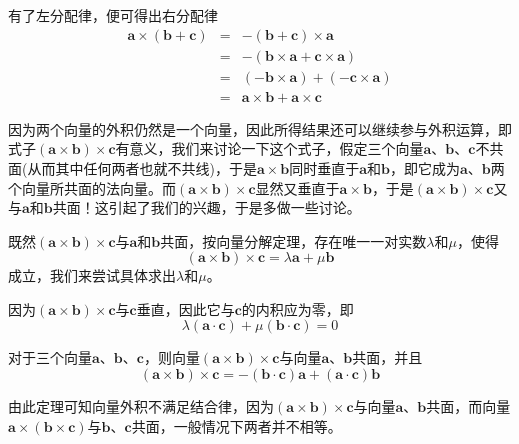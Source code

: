 有了左分配律，便可得出右分配律
\begin{eqnarray*}
  \bm{a} \times (\bm{b} + \bm{c}) & = & - (\bm{b} + \bm{c}) \times \bm{a} \\
                                  & = & - (\bm{b} \times \bm{a} + \bm{c} \times \bm{a}) \\
                                  & = & (-\bm{b}\times\bm{a}) + (-\bm{c}\times\bm{a}) \\
  & = & \bm{a}\times\bm{b} + \bm{a}\times\bm{c}
\end{eqnarray*}

因为两个向量的外积仍然是一个向量，因此所得结果还可以继续参与外积运算，即式子$(\bm{a}\times\bm{b})\times\bm{c}$有意义，我们来讨论一下这个式子，假定三个向量$\bm{a}$、$\bm{b}$、$\bm{c}$不共面(从而其中任何两者也就不共线)，于是$\bm{a}\times\bm{b}$同时垂直于$\bm{a}$和$\bm{b}$，即它成为$\bm{a}$、$\bm{b}$两个向量所共面的法向量。而$(\bm{a}\times\bm{b})\times\bm{c}$显然又垂直于$\bm{a}\times\bm{b}$，于是$(\bm{a}\times\bm{b})\times\bm{c}$又与$\bm{a}$和$\bm{b}$共面！这引起了我们的兴趣，于是多做一些讨论。

既然$(\bm{a}\times\bm{b})\times\bm{c}$与$\bm{a}$和$\bm{b}$共面，按向量分解定理，存在唯一一对实数$\lambda$和$\mu$，使得
\[ (\bm{a}\times\bm{b})\times\bm{c}=\lambda \bm{a} + \mu \bm{b} \]
成立，我们来尝试具体求出$\lambda$和$\mu$。

因为$(\bm{a}\times\bm{b})\times\bm{c}$与$\bm{c}$垂直，因此它与$\bm{c}$的内积应为零，即
\[ \lambda (\bm{a} \cdot \bm{c}) + \mu (\bm{b} \cdot \bm{c}) = 0 \]

\begin{theorem}
  对于三个向量$\bm{a}$、$\bm{b}$、$\bm{c}$，则向量$(\bm{a}\times\bm{b})\times\bm{c}$与向量$\bm{a}$、$\bm{b}$共面，并且
  \[ (\bm{a}\times\bm{b})\times\bm{c} = -(\bm{b}\cdot\bm{c})\bm{a}+(\bm{a}\cdot\bm{c})\bm{b} \]
\end{theorem}

由此定理可知向量外积不满足结合律，因为$(\bm{a}\times\bm{b})\times\bm{c}$与向量$\bm{a}$、$\bm{b}$共面，而向量$\bm{a}\times(\bm{b}\times\bm{c})$与$\bm{b}$、$\bm{c}$共面，一般情况下两者并不相等。


